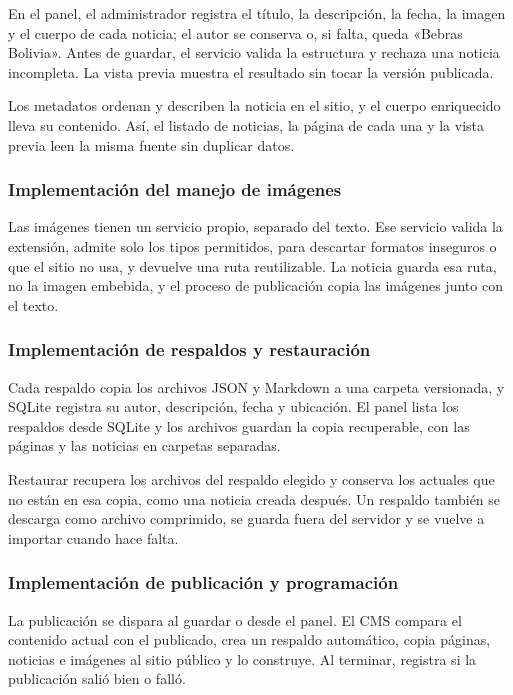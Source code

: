 En el panel, el administrador registra el título, la descripción, la fecha, la imagen y el cuerpo de cada noticia; el autor se conserva o, si falta, queda «Bebras Bolivia». Antes de guardar, el servicio valida la estructura y rechaza una noticia incompleta. La vista previa muestra el resultado sin tocar la versión publicada.

Los metadatos ordenan y describen la noticia en el sitio, y el cuerpo enriquecido lleva su contenido. Así, el listado de noticias, la página de cada una y la vista previa leen la misma fuente sin duplicar datos.

\subsubsection{Implementación del manejo de imágenes}

Las imágenes tienen un servicio propio, separado del texto. Ese servicio valida la extensión, admite solo los tipos permitidos, para descartar formatos inseguros o que el sitio no usa, y devuelve una ruta reutilizable. La noticia guarda esa ruta, no la imagen embebida, y el proceso de publicación copia las imágenes junto con el texto.

\subsubsection{Implementación de respaldos y restauración}

Cada respaldo copia los archivos JSON y Markdown a una carpeta versionada, y SQLite registra su autor, descripción, fecha y ubicación. El panel lista los respaldos desde SQLite y los archivos guardan la copia recuperable, con las páginas y las noticias en carpetas separadas.

Restaurar recupera los archivos del respaldo elegido y conserva los actuales que no están en esa copia, como una noticia creada después. Un respaldo también se descarga como archivo comprimido, se guarda fuera del servidor y se vuelve a importar cuando hace falta.

\subsubsection{Implementación de publicación y programación}

La publicación se dispara al guardar o desde el panel. El CMS compara el contenido actual con el publicado, crea un respaldo automático, copia páginas, noticias e imágenes al sitio público y lo construye. Al terminar, registra si la publicación salió bien o falló.


